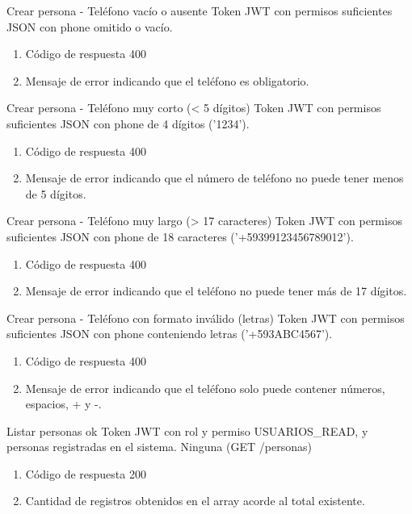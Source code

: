 {Crear persona - Teléfono vacío o ausente}
{Token JWT con permisos suficientes}
{JSON con phone omitido o vacío.}
{\begin{enumerate} [leftmargin=*, nosep]
    \item Código de respuesta 400
    \item Mensaje de error indicando que el teléfono es obligatorio.
\end{enumerate}}

{Crear persona - Teléfono muy corto (< 5 dígitos)}
{Token JWT con permisos suficientes}
{JSON con phone de 4 dígitos ('1234').}
{\begin{enumerate} [leftmargin=*, nosep]
    \item Código de respuesta 400
    \item Mensaje de error indicando que el número de teléfono no puede tener menos de 5 dígitos.
\end{enumerate}}

{Crear persona - Teléfono muy largo (> 17 caracteres)}
{Token JWT con permisos suficientes}
{JSON con phone de 18 caracteres ('+59399123456789012').}
{\begin{enumerate} [leftmargin=*, nosep]
    \item Código de respuesta 400
    \item Mensaje de error indicando que el teléfono no puede tener más de 17 dígitos.
\end{enumerate}}

{Crear persona - Teléfono con formato inválido (letras)}
{Token JWT con permisos suficientes}
{JSON con phone conteniendo letras ('+593ABC4567').}
{\begin{enumerate} [leftmargin=*, nosep]
    \item Código de respuesta 400
    \item Mensaje de error indicando que el teléfono solo puede contener números, espacios, + y -.
\end{enumerate}}

{Listar personas ok}
{Token JWT con rol y permiso USUARIOS\_READ, y personas registradas en el sistema.}
{Ninguna (GET /personas)}
{\begin{enumerate} [leftmargin=*, nosep]
    \item Código de respuesta 200
    \item Cantidad de registros obtenidos en el array acorde al total existente.
\end{enumerate}}

